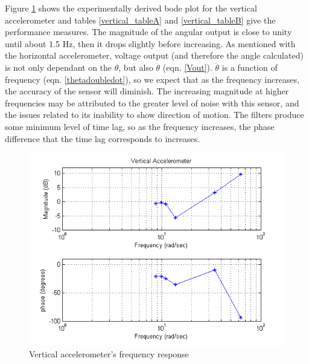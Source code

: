 \documentclass{article}
\theoremstyle{plain}
\theoremstyle{definition}
\theoremstyle{remark}
\begin{document}
Figure \ref{verticalBode} shows the experimentally derived bode plot for the vertical accelerometer and tables \ref{vertical_tableA} and \ref{vertical_tableB} give the performance measures. The magnitude of the angular output is close to unity until about 1.5 Hz, then it drops slightly before increasing. As mentioned with the horizontal accelerometer, voltage output  (and therefore the angle calculated) is not only dependant on the $\theta$, but also $\ddot{\theta}$ (eqn. \ref{Vout}).  $\ddot{\theta}$ is a function of frequency (eqn. \ref{thetadoubledot}), so we expect that as the frequency increases, the accuracy of the sensor will diminish. The increasing magnitude at higher frequencies may be attributed to the greater level of noise with this sensor, and the issues related to its inability to show direction of motion. The filters produce some minimum level of time lag, so as the frequency increases, the phase difference that the time lag corresponds to increases. \\


\begin{figure}[hbt]
\begin{center}
\includegraphics[width = 14cm]{VerticalBode.png}
\caption{Vertical accelerometer's frequency response}
\label{verticalBode}
\end{center}
\end{figure}
\end{document}
